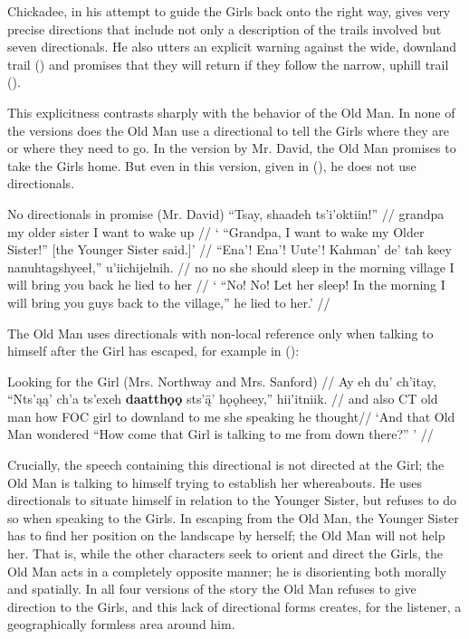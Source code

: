 Chickadee, in his attempt to guide the Girls back onto the right way, gives very precise directions that include not only a description of the trails involved but seven directionals. He also utters an explicit warning against the wide, downland trail () and promises that they will return if they follow the narrow, uphill trail ().

This explicitness contrasts sharply with the behavior of the Old Man. In none of the versions does the Old Man use a directional to tell the Girls where they are or where they need to go. In the version by Mr. David, the Old Man promises to take the Girls home. But even in this version, given in (), he does not use directionals.

\pex No directionals in promise (Mr. David) 
\a
\begingl
\gla ``Tsay, shaadeh ts'i'oktiin!''  //
\glb grandpa {my older sister} {I want to wake up} //
\glft ` ``Grandpa, I want to wake my Older Sister!'' [the Younger Sister said.]' //
\endgl
\a
\begingl
\gla ``Ena'! Ena'! Uute'! {Kahman' de' tah} keey nanuhtagshyeeł,'' u'iichijelnih.  //
\glb no no {she should sleep} {in the morning} village {I will bring you back} {he lied to her} //
\glft ` ``No! No! Let her sleep! In the morning I will bring you guys back to the village,'' he lied to her.' //
\endgl
\xe

The Old Man uses directionals with non-local reference only when talking to himself after the Girl has escaped, for example in ():

\ex
\begingl
\glpreamble Looking for the Girl (Mrs. Northway and Mrs. Sanford)  //
\gla Ay eh du' ch'itay, ``Nts'ąą' ch'a ts'exeh \textbf{daatthǫǫ} sts'ą̈' hǫǫheey,'' hii'itniik. //
\glb and also CT {old man} how FOC girl {to downland} {to me} {she speaking} {he thought}//
\glft `And that Old Man wondered ``How come that Girl is talking to me from down there?'' ' //
\endgl
\xe

Crucially, the speech containing this directional is not directed at the Girl; the Old Man is talking to himself trying to establish her whereabouts. He uses directionals to situate himself in relation to the Younger Sister, but refuses to do so when speaking to the Girls. In escaping from the Old Man, the Younger Sister has to find her position on the landscape by herself; the Old Man will not help her. That is, while the other characters seek to orient and direct the Girls, the Old Man acts in a completely opposite manner; he is disorienting both morally and spatially. In all four versions of the story the Old Man refuses to give direction to the Girls, and this lack of directional forms creates, for the listener, a geographically formless area around him.

